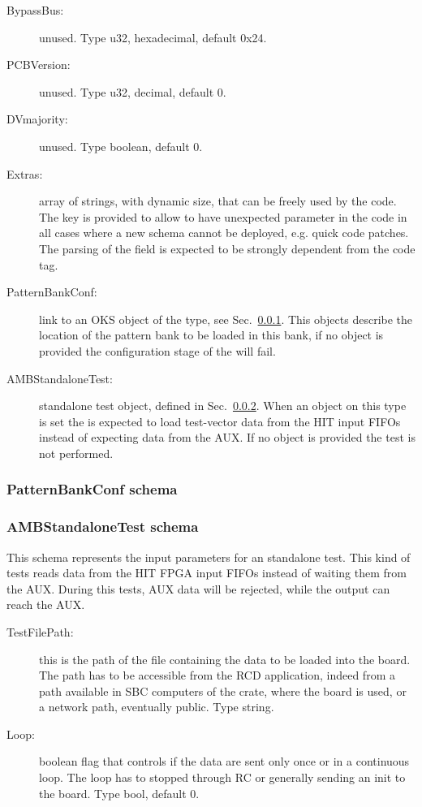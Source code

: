 \begin{description}
\item[BypassBus:] unused. Type u32, hexadecimal, default 0x24.

\item[PCBVersion:] unused. Type u32, decimal, default 0.

\item[DVmajority:] unused. Type boolean, default 0.

\item[Extras:] array of strings, with dynamic size, that can be freely used by the code.
The key is provided to allow to have unexpected parameter in the code in all cases
where a new schema cannot be deployed, e.g. quick code patches. The parsing of the
field is expected to be strongly dependent from the code tag.

\item[PatternBankConf:] link to an OKS object of the \textbf{} type,
see Sec.~\ref{sec:pattbankschema}. This objects describe the location of the pattern
bank to be loaded in this bank, if no object is provided the configuration stage
of the \RCModule will fail.

\item[AMBStandaloneTest:] standalone test object, defined in Sec.~\ref{sec:ambtestschema}.
When an object on this type is set the \AMBoard is expected to load test-vector
data from the HIT input FIFOs instead of expecting data from the AUX. If no
object is provided the test is not performed.
\end{description}


\subsubsection{PatternBankConf schema}
\label{sec:pattbankschema}

\subsubsection{AMBStandaloneTest schema}
\label{sec:ambtestschema}

This schema represents the input parameters for an \AMBoard standalone test.
This kind of tests reads data from the HIT FPGA input FIFOs instead of waiting
them from the AUX. During this tests, AUX data will be rejected, while the
output can reach the AUX.

\begin{description}
	\item[TestFilePath:] this is the path of the file containing the data to
	be loaded into the board. The path has to be accessible from the RCD application,
 indeed	from a path available in SBC computers of the crate, where the board is used,
 or a network path, eventually public. Type string.
 
 \item[Loop:] boolean flag that controls if the data are sent only once or
 in a continuous loop. The loop has to stopped through RC or generally sending
 an init to the board. Type bool, default 0.
\end{description}